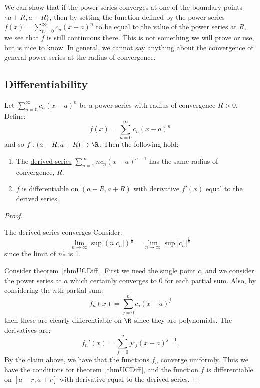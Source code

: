 \documentclass[../Main.tex]{subfiles}
\begin{document}
\begin{remark}
    We can show that if the power series converges at one of the boundary points $\{a+R, a-R\}$, then by setting the function defined by the power series $f(x) = \sum_{n=0}^{\infty}c_n (x-a)^n$ to be equal to the value of the power series at $R$, we see that $f$ is still continuous there. This is not something we will prove or use, but is nice to know. In general, we cannot say anything about the convergence of general power series at the radius of convergence.
\end{remark}
\subsection{Differentiability}
\begin{theorem}
    Let $\sum_{n = 0}^\infty c_n (x-a)^n$ be a power series with radius of convergence $R > 0$. Define:
    \begin{equation*}
        f(x) = \sum_{n = 0}^\infty c_n (x-a)^n
    \end{equation*}
    and so $f : (a-R, a+R) \mapsto \R$. Then the following hold:
    \begin{enumerate}
        \item The \underline{derived series} $\sum_{n = 1}^\infty nc_n (x-a)^{n-1}$ has the same radius of convergence, $R$.
        \item $f$ is differentiable on $(a-R, a+R)$ with derivative $f'(x)$ equal to the derived series.
    \end{enumerate}
    \label{thmPSDiff}
\end{theorem}
\begin{proof}
    \begin{subproof}{The derived series converges}
        Consider:
        \begin{equation*}
            \lim_{n \to \infty} \sup (n|c_n|)^\frac{1}{n} = \lim_{n \to \infty} \sup |c_n|^\frac{1}{n}
        \end{equation*}
        since the limit of $n^\frac{1}{n}$ is 1.
    \end{subproof}
    Consider theorem~\ref{thmUCDiff}. First we need the single point $c$, and we consider the power series at $a$ which certainly converges to $0$ for each partial sum. Also, by considering the $n$th partial sum:
    \begin{equation*}
        f_n(x) = \sum_{j = 0}^n c_j (x-a)^j
    \end{equation*}
    then these are clearly differentiable on $\R$ since they are polynomials. The derivatives are:
    \begin{equation*}
        f_n'(x) = \sum_{j = 0}^n jc_j (x-a)^{j-1}.
    \end{equation*}
    By the claim above, we have that the functions $f_n$ converge uniformly. Thus we have the conditions for theorem~\ref{thmUCDiff}, and the function $f$ is differentiable on $[a-r, a+r]$ with derivative equal to the derived series.
\end{proof}
\end{document}

